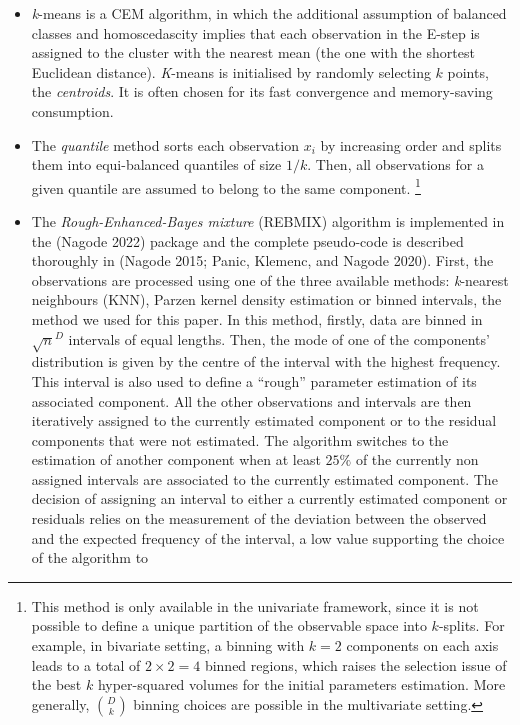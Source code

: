 \begin{itemize}
\item
  \emph{k}-means is a CEM algorithm, in which the additional assumption of
  balanced classes and homoscedascity implies that each observation in
  the E-step is assigned to the cluster with the nearest mean (the one
  with the shortest Euclidean distance). \emph{K}-means is initialised by
  randomly selecting \(k\) points, the \emph{centroids}. It is often chosen
  for its fast convergence and memory-saving consumption.
\item
  The \emph{quantile} method sorts each observation \(x_i\) by increasing
  order and splits them into equi-balanced quantiles of size \(1/k\). Then, all
  observations for a given quantile are assumed to belong to the same
  component. \footnote{This method is only available in the univariate framework,
  since it is not possible to define a unique partition of the observable space into $k$-splits. For example, in bivariate setting, a binning with $k=2$ components on each axis leads to a total of $2 \times 2=4$ binned regions, which raises the selection issue of the best $k$ hyper-squared volumes for the initial parameters estimation. More generally, $\binom{D}{k}$ binning choices are possible in the multivariate setting.}
\item
  The \emph{Rough-Enhanced-Bayes mixture} (REBMIX) algorithm is implemented
  in the  (Nagode 2022) package and the complete
  pseudo-code is described thoroughly in (Nagode 2015; Panic, Klemenc, and Nagode 2020). First, the
  observations are processed using one of the three available methods:
  \emph{k}-nearest neighbours (KNN), Parzen kernel density estimation or
  binned intervals, the method we used for this paper. In this method, firstly, data are
  binned in \(\sqrt{n}^D\) intervals of equal lengths. Then, the mode of
  one of the components' distribution is given by the centre of the interval
  with the highest frequency. This interval is also used to define a
  ``rough'' parameter estimation of its associated component. All the
  other observations and intervals are then iteratively assigned to
  the currently estimated component or to the residual components that
  were not estimated. The algorithm switches to the estimation of
  another component when at least \(25\%\) of the currently non
  assigned intervals are associated to the currently estimated
  component.
  The decision of assigning an interval to either a currently estimated component or residuals relies on the measurement of the deviation between the observed and the expected
  frequency of the interval, a low value supporting the choice of the algorithm to

\end{itemize}

